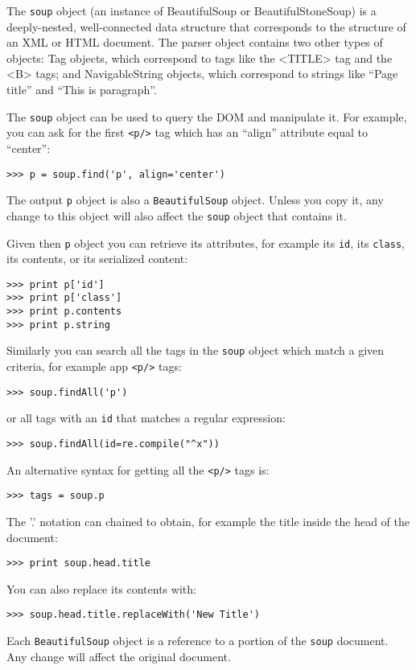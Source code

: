 \documentclass[justified,sixbynine]{tufte-book}
\def\ft{\small\tt}
\theoremstyle{plain}%
\theoremstyle{definition}
\theoremstyle{remark}
\begin{document}
\begin{fullwidth}
The {\ft soup} object (an instance of BeautifulSoup or BeautifulStoneSoup) is a deeply-nested, well-connected data structure that corresponds to the structure of an XML or HTML document. The parser object contains two other types of objects: Tag objects, which correspond to tags like the <TITLE> tag and the <B> tags; and NavigableString objects, which correspond to strings like ``Page title'' and ``This is paragraph''.

The {\ft soup} object can be used to query the DOM and manipulate it. For example, you can ask for the first {\ft <p/>} tag which has an ``align'' attribute equal to ``center'':
\begin{lstlisting}
>>> p = soup.find('p', align='center')
\end{lstlisting}
The output {\ft p} object is also a {\ft BeautifulSoup} object. Unless you copy it, any change to this object will also affect the {\ft soup} object that contains it.

Given then {\ft p} object you can retrieve its attributes, for example its {\ft id}, its {\ft class}, its contents, or its serialized content:
\begin{lstlisting}
>>> print p['id']
>>> print p['class']
>>> print p.contents
>>> print p.string
\end{lstlisting}
Similarly you can search all the tags in the {\ft soup} object which match a given criteria, for example app {\ft <p/>} tags:
\begin{lstlisting}
>>> soup.findAll('p')
\end{lstlisting}
or all tags with an {\ft id} that matches a regular expression:
\begin{lstlisting}
>>> soup.findAll(id=re.compile("^x"))
\end{lstlisting}
An alternative syntax for getting all the {\ft <p/>} tags is:
\begin{lstlisting}
>>> tags = soup.p
\end{lstlisting}
The '.' notation can chained to obtain, for example the title inside the head of the document:
\begin{lstlisting}
>>> print soup.head.title
\end{lstlisting}
You can also replace its contents with:
\begin{lstlisting}
>>> soup.head.title.replaceWith('New Title')
\end{lstlisting}
Each {\ft BeautifulSoup} object is a reference to a portion of the {\ft soup} document. Any change will affect the original document.


\end{fullwidth}
\end{document}
